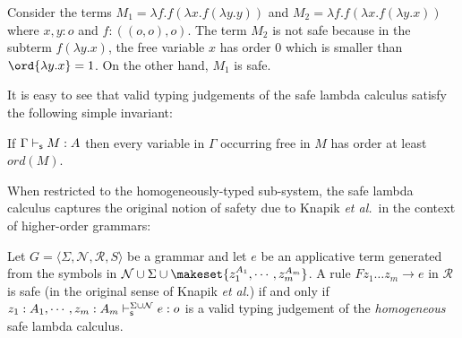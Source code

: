 \begin{example}
\label{ex:kierstead}
Consider the terms $M_1 = \lambda f . f (\lambda x . f (\lambda y . y
))$ and $M_2 = \lambda f . f (\lambda x . f (\lambda y .x ))$ where
$x,y:o$ and $f:((o,o),o)$. The term $M_2$ is not safe because in the
subterm $f (\lambda y . x)$, the free variable $x$ has order $0$ which
is smaller than $\ord{\lambda y . x} = 1$.  On the other hand, $M_1$
is safe.
\end{example}

It is easy to see that valid typing judgements of the safe lambda
calculus satisfy the following simple invariant:
\begin{lemma}
\label{lem:ordfreevar}
If $\Gamma \vdash_{\sf s} M : A$ then every variable in $\Gamma$ occurring
free in $M$ has order at least $ord(M)$.
\end{lemma}


When restricted to the homogeneously-typed sub-system, the safe
lambda calculus captures the original notion of safety due to Knapik
\emph{et al.}~in the context of higher-order grammars:

\begin{proposition} Let $G = \langle \Sigma, \mathcal{N}, \mathcal{R},
  S \rangle$ be a grammar and let $e$ be an applicative term generated
  from the symbols in $\mathcal{N} \cup \Sigma \cup \makeset{z_1^{A_1},
    \cdots, z_m^{A_m}}$.  A rule $F z_1 \ldots z_m \rightarrow e$ in
  $\mathcal{R}$ is safe (in the original sense of Knapik \emph{et al.}) if and only if $ z_1 : A_1, \cdots, z_m : A_m
  \vdash_{\sf s}^{\Sigma \cup \mathcal{N}} e : o$ is a valid typing judgement
  of the \emph{homogeneous} safe lambda calculus.
\end{proposition}

